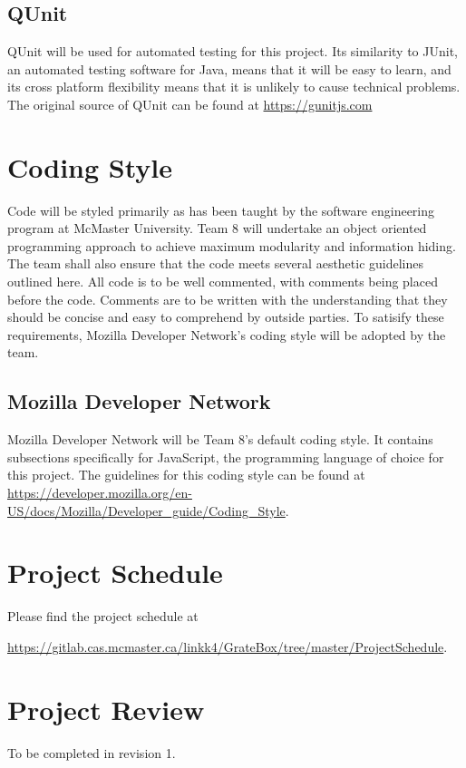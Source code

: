 \documentclass{article}
\begin{document}
\subsection{QUnit}
QUnit will be used for automated testing for this project. Its similarity to JUnit, an automated testing software for Java, means that it will be easy to learn, and its cross platform flexibility means that it is unlikely to cause technical problems. The original source of QUnit can be found at
\href{https://qunitjs.com/}{https://gunitjs.com}

\section{Coding Style}

Code will be styled primarily as has been taught by the software engineering 
program at McMaster University. Team 8 will undertake an object oriented 
programming approach to achieve maximum modularity and information hiding. The 
team shall also ensure that the code meets several aesthetic guidelines outlined 
here. All code is to be well commented, with comments being placed before the 
code. Comments are to be written with the understanding that they should be 
concise and easy to comprehend by outside parties. To satisify these requirements, Mozilla Developer Network's coding style will be adopted by the team. 

\subsection{Mozilla Developer Network}

Mozilla Developer Network will be Team 8's default coding style. It contains 
subsections specifically for JavaScript, the programming language of choice for 
this project.  The guidelines for this coding style can be found at
\href{https://developer.mozilla.org/en-US/docs/Mozilla/Developer\_guide/Coding\_Style}{https://developer.mozilla.org/en-US/docs/Mozilla/Developer\_guide/Coding\_Style}.

\section{Project Schedule}
Please find the project schedule at 

\href{https://gitlab.cas.mcmaster.ca/linkk4/GrateBox/tree/master/ProjectSchedule} 
{https://gitlab.cas.mcmaster.ca/linkk4/GrateBox/tree/master/ProjectSchedule}.

\section{Project Review}
To be completed in revision 1.
\end{document}
